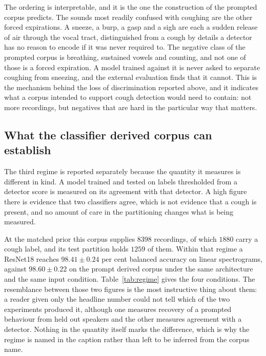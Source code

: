 \documentclass{ieeeaccess}
\begin{document}
The ordering is interpretable, and it is the one the construction of the prompted corpus
predicts. The sounds most readily confused with coughing are the other forced
expirations. A sneeze, a burp, a gasp and a sigh are each a sudden release of air through
the vocal tract, distinguished from a cough by details a detector has no reason to encode
if it was never required to. The negative class of the prompted corpus is breathing,
sustained vowels and counting, and not one of those is a forced expiration. A model
trained against it is never asked to separate coughing from sneezing, and the external
evaluation finds that it cannot. This is the mechanism behind the loss of discrimination
reported above, and it indicates what a corpus intended to support cough detection would
need to contain: not more recordings, but negatives that are hard in the particular way
that matters.

\subsection{What the classifier derived corpus can establish}\label{sec:res-regime}

The third regime is reported separately because the quantity it measures is different in
kind. A model trained and tested on labels thresholded from a detector score is measured on
its agreement with that detector. A high figure there is evidence that two classifiers
agree, which is not evidence that a cough is present, and no amount of care in the
partitioning changes what is being measured.

At the matched prior this corpus supplies $8398$ recordings, of which $1880$ carry a cough
label, and its test partition holds $1259$ of them. Within that regime a ResNet18 reaches
$98.41 \pm 0.24$ per cent balanced accuracy on linear spectrograms, against $98.60 \pm
0.22$ on the prompt derived corpus under the same architecture and the same input
condition. Table~\ref{tab:regime} gives the four conditions. The resemblance between those
two figures is the most instructive thing about them: a reader given only the headline
number could not tell which of the two experiments produced it, although one measures
recovery of a prompted behaviour from held out speakers and the other measures agreement
with a detector. Nothing in the quantity itself marks the difference, which is why the
regime is named in the caption rather than left to be inferred from the corpus name.
\end{document}
